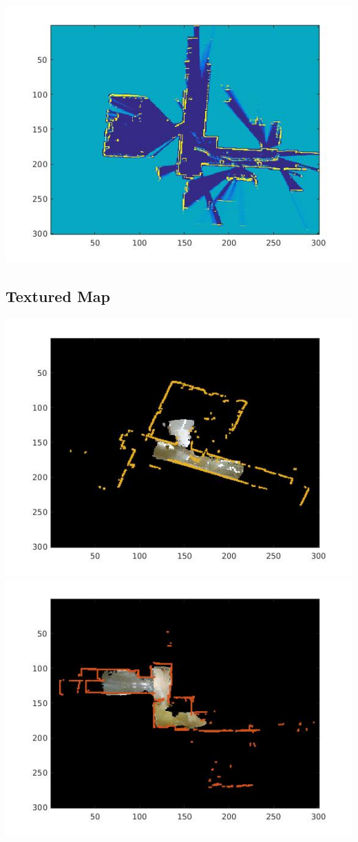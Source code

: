 \documentclass[english]{article}
\begin{document}
\includegraphics[scale=0.8]{logmap3.jpg}\\
\subsection*{Textured Map}
\includegraphics[scale=0.8]{map0texture.jpg}\\
\includegraphics[scale=0.8]{map3texture.jpg}\\
\end{document}
